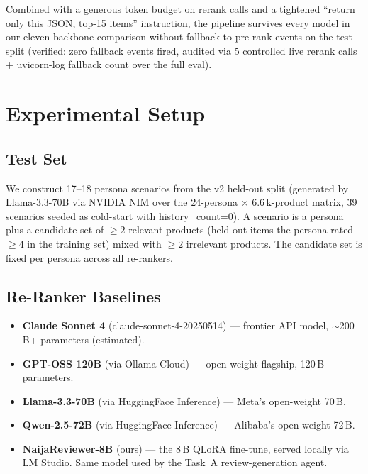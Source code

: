 \documentclass[sigconf,nonacm,balance]{acmart}
\begin{document}
Combined with a generous token budget on rerank calls and a tightened
``return only this JSON, top-15 items'' instruction, the pipeline survives
every model in our eleven-backbone comparison without fallback-to-pre-rank
events on the test split (verified: zero fallback events fired, audited via
5 controlled
live rerank calls + uvicorn-log fallback count over the full eval).

\section{Experimental Setup}
\label{sec:experiments}

\subsection{Test Set}

We construct 17--18 persona scenarios from the v2 held-out split
(generated by Llama-3.3-70B via NVIDIA NIM over the 24-persona $\times$
6.6\,k-product matrix, 39 scenarios seeded as cold-start with
\textsf{history\_count}=0). A scenario is a persona plus a candidate set
of $\geq 2$ relevant products (held-out items the persona rated $\geq 4$
in the training set) mixed with $\geq 2$ irrelevant products. The
candidate set is fixed per persona across all re-rankers.

\subsection{Re-Ranker Baselines}

\begin{itemize}[leftmargin=*]
    \item \textbf{Claude Sonnet 4} (\textsf{claude-sonnet-4-20250514}) ---
          frontier API model, $\sim$200\,B+ parameters (estimated).
    \item \textbf{GPT-OSS 120B} (via Ollama Cloud) --- open-weight
          flagship, 120\,B parameters.
    \item \textbf{Llama-3.3-70B} (via HuggingFace Inference) ---
          Meta's open-weight 70\,B.
    \item \textbf{Qwen-2.5-72B} (via HuggingFace Inference) ---
          Alibaba's open-weight 72\,B.
    \item \textbf{NaijaReviewer-8B} (ours) --- the 8\,B QLoRA fine-tune,
          served locally via LM Studio. Same model used by the Task~A
          review-generation agent.
\end{itemize}
\end{document}
